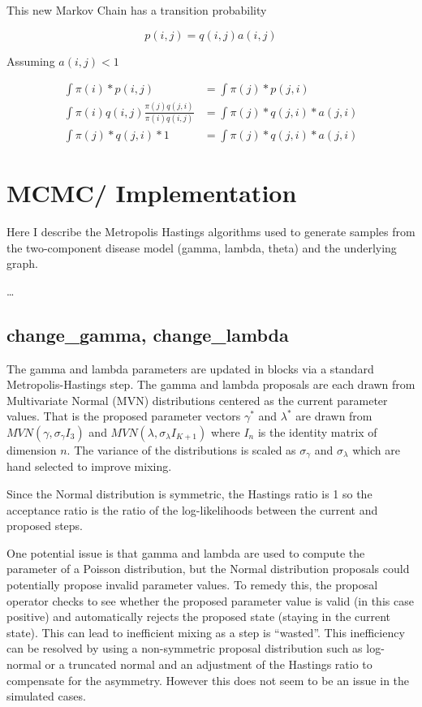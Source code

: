 \documentclass[]{article}
\numberwithin{equation}{section}
\begin{document}
This new Markov Chain has a transition probability

\[p(i,j) = q(i,j)a(i,j)\]

Assuming \(a(i,j) < 1\)

\[ \begin{aligned} \int \pi(i)*p(i,j) & = \int\pi(j)*p(j,i) \\
\int \pi(i)q(i,j)\frac{\pi(j)q(j,i)}{\pi(i)q(i,j)} & = \int\pi(j)*q(j,i)*a(j,i) \\ \int \pi(j)*q(j,i)*1 & = \int\pi(j)*q(j,i)*a(j,i)
\end{aligned}\]

\hypertarget{mcmc-implementation}{%
\section{MCMC/ Implementation}\label{mcmc-implementation}}

Here I describe the Metropolis Hastings algorithms used to generate
samples from the two-component disease model (gamma, lambda, theta) and
the underlying graph.

\ldots{}

\hypertarget{change_gamma-change_lambda}{%
\subsection{change\_gamma,
change\_lambda}\label{change_gamma-change_lambda}}

The gamma and lambda parameters are updated in blocks via a standard
Metropolis-Hastings step. The gamma and lambda proposals are each drawn
from Multivariate Normal (MVN) distributions centered as the current
parameter values. That is the proposed parameter vectors \(\gamma^*\)
and \(\lambda^*\) are drawn from \(MVN(\gamma, \sigma_\gamma I_3)\) and
\(MVN(\lambda, \sigma_\lambda I_{K+1})\) where \(I_n\) is the identity
matrix of dimension \(n\). The variance of the distributions is scaled
as \(\sigma_\gamma\) and \(\sigma_\lambda\) which are hand selected to
improve mixing.

Since the Normal distribution is symmetric, the Hastings ratio is 1 so
the acceptance ratio is the ratio of the log-likelihoods between the
current and proposed steps.

One potential issue is that gamma and lambda are used to compute the
parameter of a Poisson distribution, but the Normal distribution
proposals could potentially propose invalid parameter values. To remedy
this, the proposal operator checks to see whether the proposed parameter
value is valid (in this case positive) and automatically rejects the
proposed state (staying in the current state). This can lead to
inefficient mixing as a step is ``wasted''. This inefficiency can be
resolved by using a non-symmetric proposal distribution such as
log-normal or a truncated normal and an adjustment of the Hastings ratio
to compensate for the asymmetry. However this does not seem to be an
issue in the simulated cases.
\end{document}
